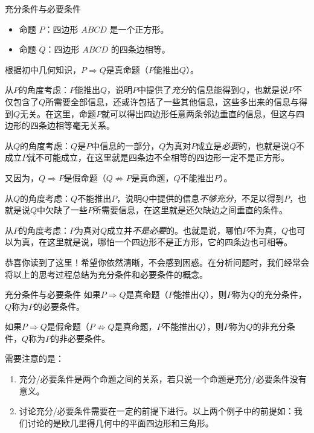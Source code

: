 \begin{example}{充分条件与必要条件}
\begin{itemize}
\item 命题 $P$：四边形 $ABCD$ 是一个正方形。
\item 命题 $Q$：四边形 $ABCD$ 的四条边相等。
\end{itemize}

根据初中几何知识，$P\Rightarrow Q$是真命题（$P$能推出$Q$）。

从$P$的角度考虑：$P$能推出$Q$，说明$P$中提供了\textsl{充分}的信息能得到$Q$，也就是说$P$不仅包含了$Q$所需要全部信息，还或许包括了一些其他信息，这些多出来的信息与得到$Q$无关。在这里，命题$P$就可以得出四边形任意两条邻边垂直的信息，但这与四边形的四条边相等毫无关系。

从$Q$的角度考虑：$Q$是$P$中信息的一部分，$Q$为真对$P$成立是\textsl{必要}的，也就是说$Q$不成立$P$就不可能成立，在这里就是四条边不全相等的四边形一定不是正方形。

又因为，$Q\Rightarrow P$是假命题（$Q\not\Rightarrow P$是真命题，$Q$不能推出$P$）。

从$Q$的角度考虑：$Q$不能推出$P$，说明$Q$中提供的信息\textsl{不够充分}，不足以得到$P$，也就是说$Q$中欠缺了一些$P$所需要信息，在这里就是还欠缺边之间垂直的条件。

从$P$的角度考虑：$P$为真对$Q$成立并\textsl{不是必要}的。也就是说，哪怕$P$不为真，$Q$也可以为真，在这里就是说，哪怕一个四边形不是正方形，它的四条边也可相等。
\end{example}

恭喜你读到了这里！希望你依然清晰，不会感到困惑。在分析问题时，我们经常会将以上的思考过程总结为充分条件和必要条件的概念。

\begin{definition}{充分条件与必要条件}
如果$P\Rightarrow Q$是真命题（$P$能推出$Q$），则$P$称为$Q$的充分条件，$Q$称为$P$的必要条件。

如果$P\Rightarrow Q$是假命题（$P\not\Rightarrow Q$是真命题，$P$不能推出$Q$），则$P$称为$Q$的非充分条件，$Q$称为$P$的非必要条件。
\end{definition}

需要注意的是：
\begin{enumerate}
\item 充分/必要条件是两个命题之间的关系，若只说一个命题是充分/必要条件没有意义。
\item 讨论充分/必要条件需要在一定的前提下进行。以上两个例子中的前提如：我们讨论的是欧几里得几何中的平面四边形和三角形。
\end{enumerate}

